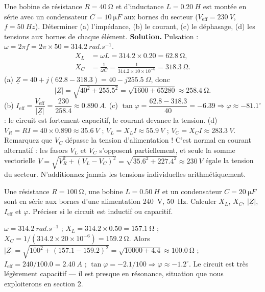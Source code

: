 \documentclass[11pt]{article}
\begin{document}
\begin{exoresolu}
Une bobine de résistance $R=\SI{40}{\ohm}$ et d'inductance $L=\SI{0.20}{H}$ est montée en série avec un condensateur $C=\SI{10}{\micro F}$ aux bornes du secteur ($V_{\mathrm{eff}}=\SI{230}{V}$, $f=\SI{50}{Hz}$). Déterminer (a) l'impédance, (b) le courant, (c) le déphasage, (d) les tensions aux bornes de chaque élément.
\tcblower
\textbf{Solution.} Pulsation : $\omega=2\pi f=2\pi\times 50=\SI{314.2}{rad.s^{-1}}$.
\begin{align*}
X_{L}&=\omega L=314.2\times 0.20=\SI{62.8}{\ohm},\\
X_{C}&=\frac{1}{\omega C}=\frac{1}{314.2\times 10\times 10^{-6}}=\SI{318.3}{\ohm}.
\end{align*}
(a) $\underline{Z}=40+j(62.8-318.3)=40-j255.5\ \Omega$, donc
\[
|\underline{Z}|=\sqrt{40^{2}+255.5^{2}}=\sqrt{1600+65280}\approx\SI{258.4}{\ohm}.
\]
(b) $I_{\mathrm{eff}}=\dfrac{V_{\mathrm{eff}}}{|\underline{Z}|}=\dfrac{230}{258.4}\approx\SI{0.890}{A}$.
(c) $\tan\varphi=\dfrac{62.8-318.3}{40}=-6.39\Rightarrow\varphi\approx -81.1^{\circ}$ : le circuit est fortement capacitif, le courant devance la tension.
(d) $V_{R}=RI=40\times 0.890\approx\SI{35.6}{V}$ ; $V_{L}=X_{L}I\approx\SI{55.9}{V}$ ; $V_{C}=X_{C}I\approx\SI{283.3}{V}$.
Remarquez que $V_{C}$ dépasse la tension d'alimentation ! C'est normal en courant alternatif : les fasors $V_{L}$ et $V_{C}$ s'opposent partiellement, et seule la somme vectorielle $V=\sqrt{V_{R}^{2}+(V_{L}-V_{C})^{2}}=\sqrt{35.6^{2}+227.4^{2}}\approx\SI{230}{V}$ égale la tension du secteur. N'additionnez jamais les tensions individuelles arithmétiquement.
\end{exoresolu}

\begin{exercice}[Entraînement]
Une résistance $R=\SI{100}{\ohm}$, une bobine $L=\SI{0.50}{H}$ et un condensateur $C=\SI{20}{\micro F}$ sont en série aux bornes d'une alimentation \SI{240}{V}, \SI{50}{Hz}. Calculer $X_{L}$, $X_{C}$, $|\underline{Z}|$, $I_{\mathrm{eff}}$ et $\varphi$. Préciser si le circuit est inductif ou capacitif.
\end{exercice}

\begin{corrige}[Exercice 1]
$\omega=\SI{314.2}{rad.s^{-1}}$ ; $X_{L}=314.2\times 0.50=\SI{157.1}{\ohm}$ ; $X_{C}=1/(314.2\times 20\times10^{-6})=\SI{159.2}{\ohm}$. Alors $|\underline{Z}|=\sqrt{100^{2}+(157.1-159.2)^{2}}=\sqrt{10000+4.4}\approx\SI{100.0}{\ohm}$ ; $I_{\mathrm{eff}}=240/100.0=\SI{2.40}{A}$ ; $\tan\varphi=-2.1/100\Rightarrow\varphi\approx-1.2^{\circ}$. Le circuit est très légèrement capacitif — il est presque en résonance, situation que nous exploiterons en section 2.
\end{corrige}
\end{document}
